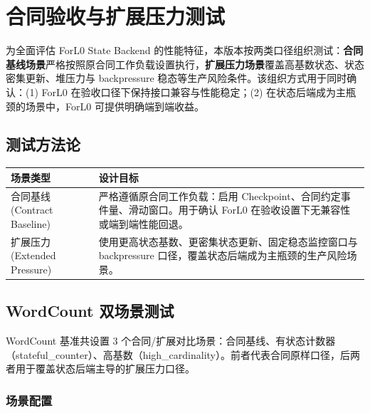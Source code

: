 \documentclass[a4paper,11pt]{article}
\newcommand{\project}{ForL0 State Backend}
\begin{document}
\section{合同验收与扩展压力测试}

为全面评估 \project{} 的性能特征，本版本按两类口径组织测试：\textbf{合同基线场景}严格按照原合同工作负载设置执行，\textbf{扩展压力场景}覆盖高基数状态、状态密集更新、堆压力与 backpressure 稳态等生产风险条件。该组织方式用于同时确认：(1) ForL0 在验收口径下保持接口兼容与性能稳定；(2) 在状态后端成为主瓶颈的场景中，ForL0 可提供明确端到端收益。

\subsection{测试方法论}

\begin{table}[H]
\centering
\small
\begin{tabularx}{\textwidth}{L{3.0cm} X}
\toprule
\textbf{场景类型} & \textbf{设计目标} \\
\midrule
合同基线 (Contract Baseline) & 严格遵循原合同工作负载：启用 Checkpoint、合同约定事件量、滑动窗口。用于确认 ForL0 在验收设置下无兼容性或端到端性能回退。 \\
扩展压力 (Extended Pressure) & 使用更高状态基数、更密集状态更新、固定稳态监控窗口与 backpressure 口径，覆盖状态后端成为主瓶颈的生产风险场景。 \\
\bottomrule
\end{tabularx}
\end{table}

\subsection{WordCount 双场景测试}

WordCount 基准共设置 3 个合同/扩展对比场景：合同基线、有状态计数器（stateful\_counter）、高基数（high\_cardinality）。前者代表合同原样口径，后两者用于覆盖状态后端主导的扩展压力口径。

\subsubsection{场景配置}
\end{document}
